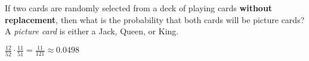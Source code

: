 \documentclass[addpoints,12pt]{exam}
\begin{document}
\begin{questions}
\question[10] If two cards are randomly selected from a deck
of playing cards {\bf without replacement},
then what is the probability that both cards
will be picture cards?  A {\em picture card} is either a Jack, Queen, or King.
\begin{solution}
$\frac{12}{52}\cdot\frac{11}{51}=\frac{11}{121}\approx 0.0498$
\end{solution}

\end{questions}

\vfill\ifprintanswers\else
\begin{center}\gradetable[h][questions]\end{center}\fi
\end{document}
